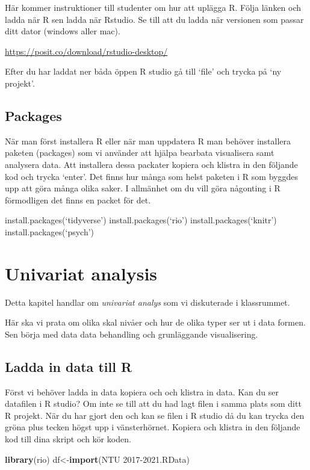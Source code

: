 \documentclass[
]{book}
\newenvironment{Shaded}{\begin{snugshade}}{\end{snugshade}}
\newcommand{\FunctionTok}[1]{\textcolor[rgb]{0.13,0.29,0.53}{\textbf{#1}}}
\newcommand{\NormalTok}[1]{#1}
\newcommand{\OtherTok}[1]{\textcolor[rgb]{0.56,0.35,0.01}{#1}}
\newcommand{\StringTok}[1]{\textcolor[rgb]{0.31,0.60,0.02}{#1}}
\begin{document}
Här kommer instruktioner till studenter om hur att uplägga
R. Följa länken och ladda när R sen ladda när Rstudio. Se till att du ladda när versionen som passar ditt dator (windows aller mac).

\url{https://posit.co/download/rstudio-desktop/}

Efter du har laddat ner båda öppen R studio gå till `file' och trycka på `ny projekt'.

\section{Packages}\label{packages}

När man först installera R eller när man uppdatera R man behöver installera paketen (packages) som vi använder att hjälpa bearbata visualisera samt analysera data. Att installera dessa packater kopiera och klistra in den följande kod och trycka `enter'. Det finns hur många som helst paketen i R som byggdes upp att göra många olika saker. I allmänhet om du vill göra någonting i R förmodligen det finns en packet för det.

install.packages(`tidyverse')
install.packages(`rio')
install.packages(`knitr')
install.packages(`psych')

\chapter{Univariat analysis}\label{univariat-analysis}

Detta kapitel handlar om \emph{univariat analys} som vi diskuterade i klassrummet.

Här ska vi prata om olika skal nivåer och hur de olika typer ser ut i data formen. Sen börja med data data behandling och grunläggande visualisering.

\section{Ladda in data till R}\label{ladda-in-data-till-r}

Först vi behöver ladda in data kopiera och och klistra in data. Kan du ser datafilen i R studio? Om inte se till att du had lagt filen i samma plats som ditt R projekt. När du har gjort den och kan se filen i R studio då du kan trycka den gröna plus tecken högst upp i vänsterhörnet. Kopiera och klistra in den följande kod till dina skript och kör koden.

\begin{Shaded}
\begin{Highlighting}[]
\FunctionTok{library}\NormalTok{(rio)}
\NormalTok{df}\OtherTok{\textless{}{-}}\FunctionTok{import}\NormalTok{(}\StringTok{\textquotesingle{}NTU 2017{-}2021.RData\textquotesingle{}}\NormalTok{)}
\end{Highlighting}
\end{Shaded}
\end{document}
